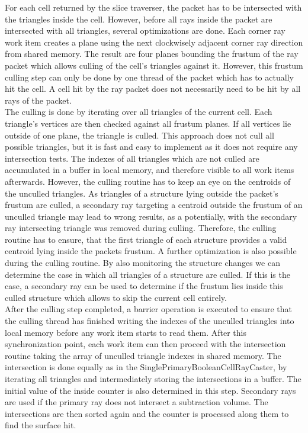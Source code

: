 For each cell returned by the slice traverser, the packet has to be intersected with the triangles inside the cell. However, before all rays inside the packet are intersected with all triangles, several optimizations are done. Each corner ray work item creates a plane using the next clockwisely adjacent corner ray direction from shared memory. The result are four planes bounding the frustum of the ray packet which allows culling of the cell's triangles against it. However, this frustum culling step can only be done by one thread of the packet which has to actually hit the cell. A cell hit by the ray packet does not necessarily need to be hit by all rays of the packet. \\
The culling is done by iterating over all triangles of the current cell. Each triangle's vertices are then checked against all frustum planes. If all vertices lie outside of one plane, the triangle is culled. This approach does not cull all possible triangles, but it is fast and easy to implement as it does not require any intersection tests. The indexes of all triangles which are not culled are accumulated in a buffer in local memory, and therefore visible to all work items afterwards. However, the culling routine has to keep an eye on the centroids of the unculled triangles. As triangles of a structure lying outside the packet's frustum are culled, a secondary ray targeting a centroid outside the frustum of an unculled triangle may lead to wrong results, as a potentially, with the secondary ray intersecting triangle was removed during culling. Therefore, the culling routine has to ensure, that the first triangle of each structure provides a valid centroid lying inside the packets frustum.
A further optimization is also possible during the culling routine. By also monitoring the structure changes we can determine the case in which all triangles of a structure are culled. If this is the case, a secondary ray can be used to determine if the frustum lies inside this culled structure which allows to skip the current cell entirely. \\
After the culling step completed, a barrier operation is executed to ensure that the culling thread has finished writing the indexes of the unculled triangles into local memory before any work item starts to read them. After this synchronization point, each work item can then proceed with the intersection routine taking the array of unculled triangle indexes in shared memory. The intersection is done equally as in the SinglePrimaryBooleanCellRayCaster, by iterating all triangles and intermediately storing the intersections in a buffer. The initial value of the inside counter is also determined in this step. Secondary rays are used if the primary ray does not intersect a subtraction volume. The intersections are then sorted again and the counter is processed along them to find the surface hit.

